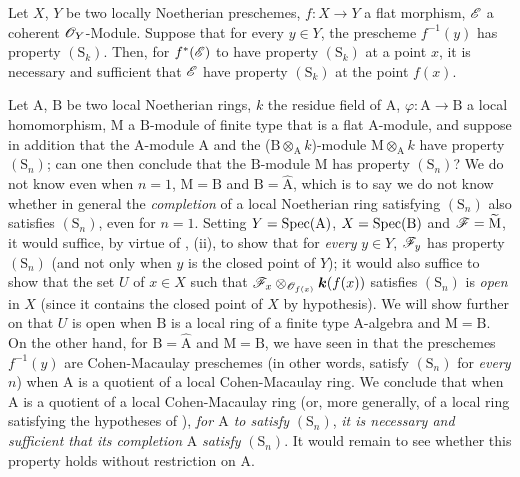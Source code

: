 \begin{corollary}[6.4.2]
\label{IV.6.4.2}
Let $X$, $Y$ be two locally Noetherian preschemes, $f:X\to Y$ a flat morphism, $\mathscr{E}$ a coherent $\mathscr{O}_Y$-Module.
Suppose that for every $y\in Y$, the prescheme $f^{-1}(y)$ has property $(\mathrm{S}_k)$.
Then, for $f^*(\mathscr{E})$ to have property $(\mathrm{S}_k)$ at a point $x$, it is necessary and sufficient that $\mathscr{E}$ have property $(\mathrm{S}_k)$ at the point $f(x)$.
\end{corollary}

\begin{remark}[6.4.3]
\label{IV.6.4.3}
Let $\mathrm{A}$, $\mathrm{B}$ be two local Noetherian rings, $k$ the residue field of $\mathrm{A}$, $\varphi:\mathrm{A}\to\mathrm{B}$ a local homomorphism, $\mathrm{M}$ a $\mathrm{B}$-module of finite type that is a flat $\mathrm{A}$-module, and suppose in addition that the $\mathrm{A}$-module $\mathrm{A}$ and the ($\mathrm{B}\otimes_\mathrm{A} k$)-module $\mathrm{M}\otimes_\mathrm{A} k$ have property $(\mathrm{S}_n)$; can one then conclude that the $\mathrm{B}$-module $\mathrm{M}$ has property $(\mathrm{S}_n)$?
We do not know even when $n=1$, $\mathrm{M}=\mathrm{B}$ and $\mathrm{B}=\hat{\mathrm{A}}$, which is to say we do not know whether in general the \emph{completion} of a local Noetherian ring satisfying $(\mathrm{S}_n)$ also satisfies $(\mathrm{S}_n)$, even for $n=1$.
Setting $Y=\operatorname{Spec}(\mathrm{A})$, $X=\operatorname{Spec}(\mathrm{B})$ and $\mathscr{F}=\widetilde{\mathrm{M}}$, it would suffice, by virtue of , (ii), to show that for \emph{every} $y\in Y$, $\mathscr{F}_y$ has property $(\mathrm{S}_n)$ (and not only when $y$ is the closed point of $Y$); it would also suffice to show that the set $U$ of $x\in X$ such that $\mathscr{F}_x\otimes_{\mathscr{O}_{f(x)}}\boldsymbol{k}(f(x))$ satisfies $(\mathrm{S}_n)$ is \emph{open} in $X$ (since it contains the closed point of $X$ by hypothesis).
We will show further on  that $U$ is open when $\mathrm{B}$ is a local ring of a finite type $\mathrm{A}$-algebra and $\mathrm{M}=\mathrm{B}$.
On the other hand, for $\mathrm{B}=\hat{\mathrm{A}}$ and $\mathrm{M}=\mathrm{B}$, we have seen in  that the preschemes $f^{-1}(y)$ are Cohen-Macaulay preschemes (in other words, satisfy $(\mathrm{S}_n)$ for \emph{every} $n$) when $\mathrm{A}$ is a quotient of a local Cohen-Macaulay ring.
We conclude that when $\mathrm{A}$ is a quotient of a local Cohen-Macaulay ring (or, more generally, of a local ring satisfying the hypotheses of ), \emph{for $\mathrm{A}$ to satisfy} $(\mathrm{S}_n)$, \emph{it is necessary and sufficient that its completion} $\hat{\mathrm{A}}$ \emph{satisfy} $(\mathrm{S}_n)$.
It would remain to see whether this property holds without restriction on $\mathrm{A}$.
\end{remark}

